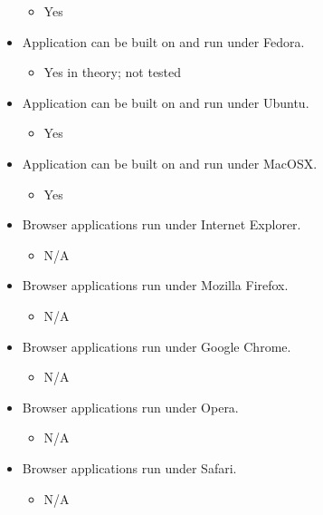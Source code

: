 \begin{itemize}
  \begin{itemize}
  \itemsep1pt\parskip0pt
  \item
    Yes
  \end{itemize}
\item
  Application can be built on and run under Fedora.

  \begin{itemize}
  \itemsep1pt\parskip0pt
  \item
    Yes in theory; not tested
  \end{itemize}
\item
  Application can be built on and run under Ubuntu.

  \begin{itemize}
  \itemsep1pt\parskip0pt
  \item
    Yes
  \end{itemize}
\item
  Application can be built on and run under MacOSX.

  \begin{itemize}
  \itemsep1pt\parskip0pt
  \item
    Yes
  \end{itemize}
\item
  Browser applications run under Internet Explorer.

  \begin{itemize}
  \itemsep1pt\parskip0pt
  \item
    N/A
  \end{itemize}
\item
  Browser applications run under Mozilla Firefox.

  \begin{itemize}
  \itemsep1pt\parskip0pt
  \item
    N/A
  \end{itemize}
\item
  Browser applications run under Google Chrome.

  \begin{itemize}
  \itemsep1pt\parskip0pt
  \item
    N/A
  \end{itemize}
\item
  Browser applications run under Opera.

  \begin{itemize}
  \itemsep1pt\parskip0pt
  \item
    N/A
  \end{itemize}
\item
  Browser applications run under Safari.

  \begin{itemize}
  \itemsep1pt\parskip0pt
  \item
    N/A
  \end{itemize}
\end{itemize}

